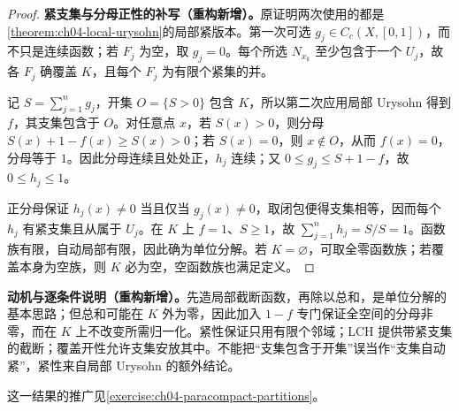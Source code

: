 \documentclass[../../main.tex]{subfiles}%
\begin{document}
\begin{proof}
\textbf{紧支集与分母正性的补写（重构新增）。}原证明两次使用的都是\cref{theorem:ch04-local-urysohn}的局部紧版本。第一次可选 $g_j\in C_c(X,[0,1])$，而不只是连续函数；若 $F_j$ 为空，取 $g_j=0$。每个所选 $N_{x_k}$ 至少包含于一个 $U_j$，故各 $F_j$ 确覆盖 $K$，且每个 $F_j$ 为有限个紧集的并。

记 $S=\sum_{j=1}^ng_j$，开集 $O=\{S>0\}$ 包含 $K$，所以第二次应用局部 Urysohn 得到 $f$，其支集包含于 $O$。对任意点 $x$，若 $S(x)>0$，则分母 $S(x)+1-f(x)\ge S(x)>0$；若 $S(x)=0$，则 $x\notin O$，从而 $f(x)=0$，分母等于 $1$。因此分母连续且处处正，$h_j$ 连续；又 $0\le g_j\le S+1-f$，故 $0\le h_j\le1$。

正分母保证 $h_j(x)\ne0$ 当且仅当 $g_j(x)\ne0$，取闭包便得支集相等，因而每个 $h_j$ 有紧支集且从属于 $U_j$。在 $K$ 上 $f=1$、$S\ge1$，故 $\sum_{j=1}^nh_j=S/S=1$。函数族有限，自动局部有限，因此确为单位分解。若 $K=\varnothing$，可取全零函数族；若覆盖本身为空族，则 $K$ 必为空，空函数族也满足定义。
\end{proof}
\begin{remark}
\textbf{动机与逐条件说明（重构新增）。}先造局部截断函数，再除以总和，是单位分解的基本思路；但总和可能在 $K$ 外为零，因此加入 $1-f$ 专门保证全空间的分母非零，而在 $K$ 上不改变所需归一化。紧性保证只用有限个邻域；LCH 提供带紧支集的截断；覆盖开性允许支集安放其中。不能把“支集包含于开集”误当作“支集自动紧”，紧性来自局部 Urysohn 的额外结论。
\end{remark}
这一结果的推广见\cref{exercise:ch04-paracompact-partitions}。
\end{document}
